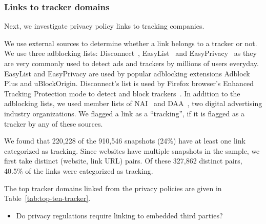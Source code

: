\subsubsection{Links to tracker domains}

Next, we investigate privacy policy links to tracking companies.

We use external sources to determine whether a link belongs to a tracker or not. We use three adblocking lists: Disconnect~\cite{disconnectme2020May}, EasyList~\cite{EasyList} and EasyPrivacy~\cite{EasyPrivacy} as they are very commonly used to detect ads and trackers by millions of users everyday.
EasyList and EasyPrivacy are used by popular adblocking extensions Adblock Plus and uBlockOrigin. Disconnect’s list is used by Firefox browser’s Enhanced Tracking Protection mode to detect and block trackers~\cite{Firefox-TPM}.
In addition to the adblocking lists, we used member lists of NAI~\cite{NAI-member-list} and DAA~\cite{DAA-member-list}, two digital advertising industry organizations. We flagged a link as a ``tracking'', if it is flagged as a tracker by any of these sources.

We found that 220,228 of the 910,546 snapshots (24\%) have at least one link categorized as tracking.
Since websites have multiple snapshots in the sample, we first take distinct (website, link URL) pairs.
Of these 327,862 distinct pairs, 40.5\% of the links were categorized as tracking.

The top tracker domains linked from the privacy policies are given in Table~\ref{tab:top-ten-tracker}.



\begin{itemize}
    \item Do privacy regulations require linking to embedded third parties?
\end{itemize}

\begin{comment}

\begin{figure}[h]
\centering
\texttt{[image: figures/top5\_link\_domains\_2009.pdf]}
\caption{Link domains that were in the top 5 most common.}
\label{fig:top-5-link-domain}
\end{figure}
\end{comment}


